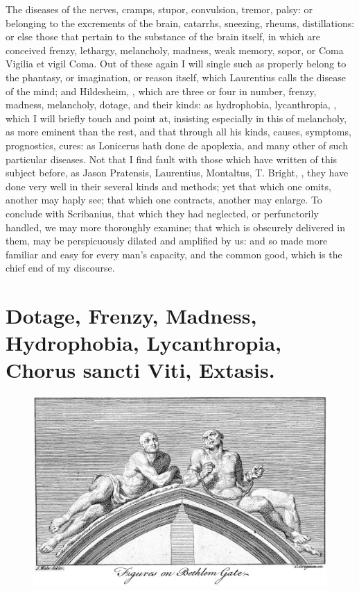 {The diseases of the nerves, cramps, stupor, convulsion, tremor, palsy:
or belonging to the excrements of the brain, catarrhs, sneezing,
rheums, distillations: or else those that pertain to the substance of
the brain itself, in which are conceived frenzy, lethargy, melancholy,
madness, weak memory, sopor, or Coma Vigilia et vigil Coma. Out of
these again I will single such as properly belong to the phantasy, or
imagination, or reason itself, which Laurentius calls the disease
of the mind; and Hildesheim, ,
 which are three or four in number, frenzy, madness, melancholy, dotage, and their kinds:
as hydrophobia, lycanthropia, , which I will briefly touch
and point at, insisting especially in this of melancholy, as more
eminent than the rest, and that through all his kinds, causes,
symptoms, prognostics, cures: as Lonicerus hath done de apoplexia, and
many other of such particular diseases. Not that I find fault with
those which have written of this subject before, as Jason Pratensis,
Laurentius, Montaltus, T. Bright, \etc{}, they have done very well in
their several kinds and methods; yet that which one omits, another may
haply see; that which one contracts, another may enlarge. To conclude
with Scribanius, that which they had neglected, or perfunctorily
handled, we may more thoroughly examine; that which is obscurely
delivered in them, may be perspicuously dilated and amplified by us:
and so made more familiar and easy for every man's capacity, and the
common good, which is the chief end of my discourse.

\section[Madness]{Dotage, Frenzy, Madness, Hydrophobia, Lycanthropia, Chorus sancti Viti, Extasis.}
\begin{figure}[H]
  \begingroup
  \centering
  \includegraphics[keepaspectratio,width=\textwidth]{figures/tmczmfhz-small.jpg}
  \label{fig:madness}
\end{figure}
}
